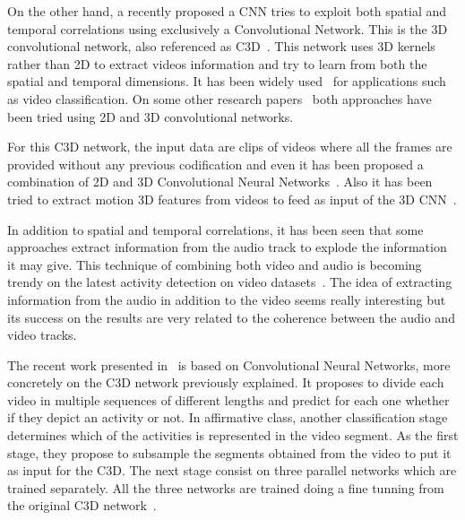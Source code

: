 On the other hand, a recently proposed a CNN tries to exploit both spatial and temporal correlations using exclusively a Convolutional Network. This is the 3D convolutional network, also referenced as C3D~\cite{tran2014learning}. This network uses 3D kernels rather than 2D to extract videos information and try to learn from both the spatial and temporal dimensions. It has been widely used~\cite{baccouche2011sequential,tran2015deep,tran2014learning,shoutemporal} for applications such as video classification. On some other research papers~\cite{yao2015describing,zhang2016modelling} both approaches have been tried using 2D and 3D convolutional networks.

For this C3D network, the input data are clips of videos where all the frames are provided without any previous codification and even it has been proposed a combination of 2D and 3D Convolutional Neural Networks~\cite{Ng_2015_CVPR,yao2015describing}. Also it has been tried to extract motion 3D features from videos to feed as input of the 3D CNN~\cite{yao2015describing}.

In addition to spatial and temporal correlations, it has been seen that some approaches extract information from the audio track to explode the information it may give. This technique of combining both video and audio is becoming trendy on the latest activity detection on video datasets~\cite{xu2015uts}. The idea of extracting information from the audio in addition to the video seems really interesting but its success on the results are very related to the coherence between the audio and video tracks.

The recent work presented in~\cite{shoutemporal} is based on Convolutional Neural Networks, more concretely on the C3D network previously explained. It proposes to divide each video in multiple sequences of different lengths and predict for each one whether if they depict an activity or not. In affirmative class, another classification stage determines which of the activities is represented in the video segment. As the first stage, they propose to subsample the segments obtained from the video to put it as input for the C3D. The next stage consist on three parallel networks which are trained separately. All the three networks are trained doing a fine tunning from the original C3D network~\cite{tran2014learning}.

